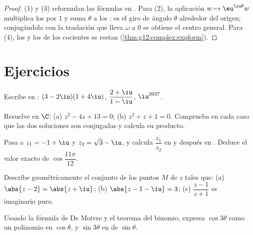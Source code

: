 \begin{proof}
(1) y (3) reformulan las fórmulas en . Para (2), la aplicación
$w \mapsto \eu^{\iu\theta} w$ multiplica los  por $1$ y suma
$\theta$ a los : es el giro de ángulo $\theta$ alrededor del
origen; conjugándola con la traslación que lleva $\omega$ a $0$ se obtiene
el centro general. Para (4), los  y los  de los cocientes
se restan (\cref{thm:g12:complex:expform}).
\end{proof}

\section{Ejercicios}

\begin{exercise}[$\star$]\label{exo:g12:complex:1}
Escribe en :
$(3 - 2\iu)(1 + 4\iu)$, \quad $\dfrac{2 + \iu}{1 - \iu}$, \quad
$\iu^{2027}$.
\end{exercise}

\begin{exercise}[$\star$]\label{exo:g12:complex:2}
Resuelve en $\C$: (a) $z^2 - 4z + 13 = 0$; (b) $z^2 + z + 1 = 0$. Comprueba
en cada caso que las dos soluciones son conjugadas y calcula su producto.
\end{exercise}

\begin{exercise}[$\star$]\label{exo:g12:complex:3}
Pasa a  $z_1 = -1 + \iu$ y $z_2 = \sqrt3 - \iu$, y calcula
$\dfrac{z_1}{z_2}$ en  y después en . Deduce
el valor exacto de $\cos\dfrac{11\pi}{12}$.
\end{exercise}

\begin{exercise}[$\star\star$]\label{exo:g12:complex:4}
Describe geométricamente el conjunto de los puntos $M$ de  $z$ tales
que:
(a) $\abs{z - 2} = \abs{z + \iu}$;\quad
(b) $\abs{z - 1 - \iu} = 3$;\quad
(c) $\dfrac{z - 1}{z + 1}$ es imaginario puro.
\end{exercise}

\begin{exercise}[$\star\star$]\label{exo:g12:complex:5}
Usando la fórmula de De Moivre y el teorema del binomio, expresa
$\cos 3\theta$ como un polinomio en $\cos\theta$, y $\sin 3\theta$ en
 de $\sin\theta$.
\end{exercise}

